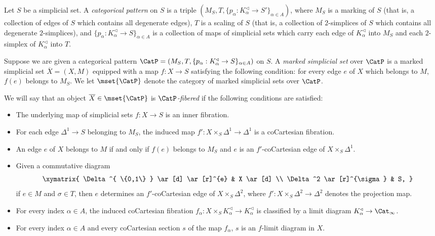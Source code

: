 \begin{definition}\label{catpat}
Let $S$ be a simplicial set. A {\it categorical pattern} on $S$ is a triple
$(M_S, T, \{ p_{\alpha}: K_{\alpha}^{\triangleleft} \rightarrow S' \}_{\alpha \in A})$, where
$M_S$ is a marking of $S$ (that is, a collection of edges of $S$ which contains all degenerate edges),
$T$ is a scaling of $S$ (that is, a collection of $2$-simplices of $S$ which contains all degenerate
$2$-simplices), and $\{ p_{\alpha}: K_{\alpha}^{\triangleleft} \rightarrow S \}_{\alpha \in A}$ is a collection of maps of simplicial sets which carry each edge of $K_{\alpha}^{\triangleleft}$ into $M_S$ and
each $2$-simplex of $K_{\alpha}^{\triangleleft}$ into $T$.

Suppose we are given a categorical pattern 
$\CatP = (M_S, T, \{ p_{\alpha}: K_{\alpha}^{\triangleleft} \rightarrow S \}_{\alpha \in A})$
on $S$. A {\it marked simplicial set} over $\CatP$ is a marked simplicial set
$\overline{X} = (X,M)$ equipped with a map $f: X \rightarrow S$ satisfying the following condition:
for every edge $e$ of $X$ which belongs to $M$, $f(e)$ belongs to $M_S$. We let
$\mset{ \CatP}$ denote the category of marked simplicial sets over $\CatP$.

We will say that an object $\overline{X} \in \mset{ \CatP}$ is {\it $\CatP$-fibered} if the following conditions are satisfied:
\begin{itemize}
\item[$(1)$] The underlying map of simplicial sets $f: X \rightarrow S$ is an inner fibration.
\item[$(2)$] For each edge $\Delta^1 \rightarrow S$ belonging to $M_S$, the induced map
$f': X \times_{S} \Delta^1 \rightarrow \Delta^1$ is a coCartesian fibration.
\item[$(3)$] An edge $e$ of $X$ belongs to $M$ if and only if $f(e)$ belongs to $M_S$ and
$e$ is an $f'$-coCartesian edge of $X \times_{S} \Delta^1$.
\item[$(4)$] Given a commutative diagram
$$ \xymatrix{ \Delta^{ \{0,1\} } \ar[d] \ar[r]^{e} & X \ar[d] \\
\Delta^2 \ar[r]^{\sigma} & S, }$$
if $e \in M$ and $\sigma \in T$, then $e$ determines an
$f'$-coCartesian edge of $X \times_{S} \Delta^2$, where
$f': X \times_{S} \Delta^2 \rightarrow \Delta^2$ denotes the projection map.

\item[$(5)$] For every index $\alpha \in A$, the induced coCartesian fibration
$f_{\alpha}: X \times_{S} K_{\alpha}^{\triangleleft} \rightarrow K_{\alpha}^{\triangleleft}$ is classified
by a limit diagram $K_{\alpha}^{\triangleleft} \rightarrow \Cat_{\infty}$.

\item[$(6)$] For every index $\alpha \in A$ and every coCartesian section
$s$ of the map $f_{\alpha}$, $s$ is an $f$-limit diagram in $X$.
\end{itemize}
\end{definition}

